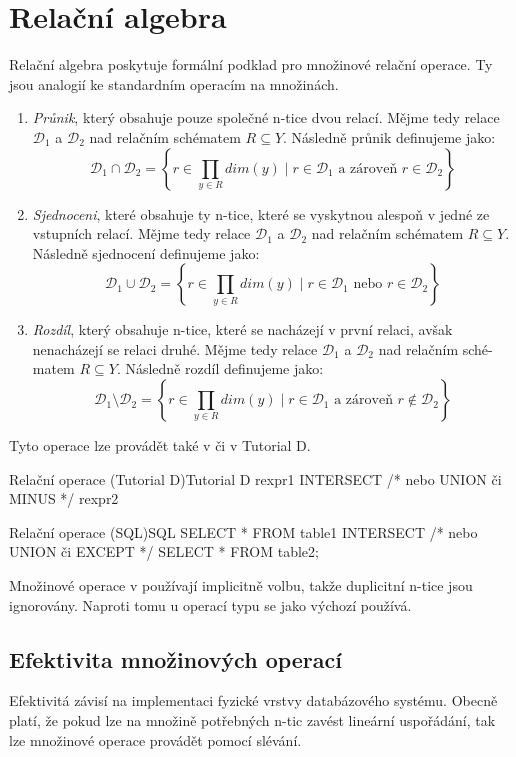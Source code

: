 \section{Relační algebra}
Relační algebra poskytuje formální podklad pro množinové relační operace. Ty jsou analogií ke standardním operacím na množinách.
\begin{enumerate}
\item \textit{Průnik}, který obsahuje pouze společné n-tice dvou relací. Mějme tedy relace $\mathcal{D}_{1}$ a $\mathcal{D}_{2}$ nad relačním schématem $R \subseteq Y$. Následně průnik definujeme jako:
$$
\mathcal{D}_{1} \cap \mathcal{D}_{2} = \left\{ r \in \prod_{y \in R} dim(y) \; | \; r \in \mathcal{D}_{1} \text{ a zároveň } r \in \mathcal{D}_{2} \right\}
$$
\item \textit{Sjednoceni}, které obsahuje ty n-tice, které se vyskytnou alespoň v jedné ze vstupních relací. Mějme tedy relace $\mathcal{D}_{1}$ a $\mathcal{D}_{2}$ nad relačním schématem $R \subseteq Y$. Následně sjednocení definujeme jako:
$$
\mathcal{D}_{1} \cup \mathcal{D}_{2} = \left\{ r \in \prod_{y \in R} dim(y) \; | \; r \in \mathcal{D}_{1} \text{ nebo } r \in \mathcal{D}_{2} \right\}
$$
\item \textit{Rozdíl}, který obsahuje n-tice, které se nacházejí v první relaci, avšak nenacházejí se relaci druhé. Mějme tedy relace $\mathcal{D}_{1}$ a $\mathcal{D}_{2}$ nad relačním sché-matem $R \subseteq Y$. Následně rozdíl definujeme jako:
$$
\mathcal{D}_{1} \setminus \mathcal{D}_{2} = \left\{ r \in \prod_{y \in R} dim(y) \; | \; r \in \mathcal{D}_{1} \text{ a zároveň } r \notin \mathcal{D}_{2} \right\}
$$
\end{enumerate}
Tyto operace lze provádět také v  či v Tutorial D.
\begin{upcode}{Relační operace (Tutorial D)}{}{Tutorial D}
rexpr1 INTERSECT /* nebo UNION či MINUS */ rexpr2
\end{upcode}
\begin{upcode}{Relační operace (SQL)}{}{SQL}
SELECT * FROM table1
	INTERSECT /* nebo UNION či EXCEPT */
SELECT * FROM table2;
\end{upcode}
Množinové operace v  používají implicitně volbu, takže duplicitní n-tice jsou ignorovány. Naproti tomu u operací typu se jako výchozí používá.

\subsection{Efektivita množinových operací}
Efektivitá závisí na implementaci fyzické vrstvy databázového systému. Obecně platí, že pokud lze na množině potřebných n-tic zavést lineární uspořádání, tak lze množinové operace provádět pomocí slévání.

